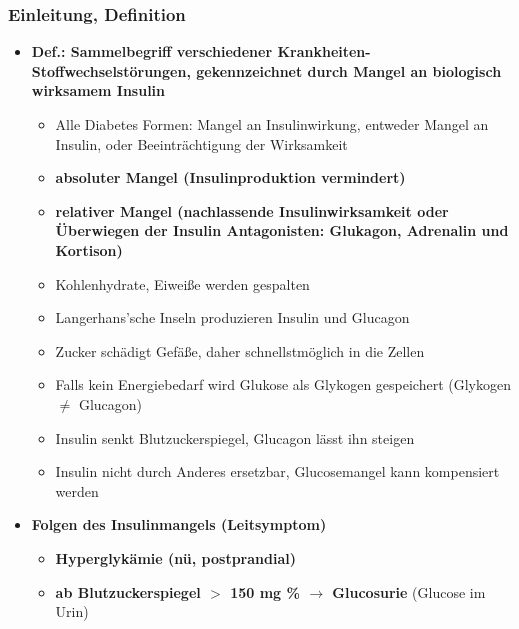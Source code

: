 	\subsubsection{Einleitung, Definition}
		\begin{itemize}
			\item \textbf{Def.: Sammelbegriff verschiedener Krankheiten-Stoffwechselstörungen, gekennzeichnet durch Mangel an biologisch wirksamem Insulin}
				\begin{itemize}
					\item Alle Diabetes Formen: Mangel an Insulinwirkung, entweder Mangel an Insulin, oder Beeinträchtigung der Wirksamkeit
					\item \textbf{absoluter Mangel (Insulinproduktion vermindert)}
					\item \textbf{relativer Mangel (nachlassende Insulinwirksamkeit oder Überwiegen der Insulin Antagonisten: Glukagon, Adrenalin und Kortison)}
					\item Kohlenhydrate, Eiweiße werden gespalten
					\item Langerhans'sche Inseln produzieren Insulin und Glucagon 
					\item Zucker schädigt Gefäße, daher schnellstmöglich in die Zellen
					\item Falls kein Energiebedarf wird Glukose als Glykogen gespeichert (Glykogen $\neq$ Glucagon)
					\item Insulin senkt Blutzuckerspiegel, Glucagon lässt ihn steigen
					\item Insulin nicht durch Anderes ersetzbar, Glucosemangel kann kompensiert werden
				\end{itemize}
			\item \textbf{Folgen des Insulinmangels (Leitsymptom)}
				\begin{itemize}
					\item \textbf{Hyperglykämie (nü, postprandial)}
					\item \textbf{ab Blutzuckerspiegel $>$ 150 mg \% $\rightarrow$ Glucosurie} (Glucose im Urin)
				\end{itemize}
		\end{itemize}

